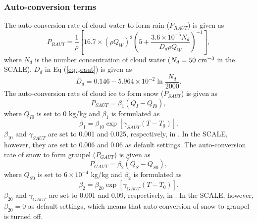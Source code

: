 \subsubsection{Auto-conversion terms}
The auto-conversion rate of cloud water to form rain ($P_{RAUT}$) is given as
\begin{equation}
  P_{RAUT}=\frac{1}{\rho}\left[16.7\times(\rho Q_{W})^{2}\left(5+\frac{3.6\times10^{-5}N_{d}}{D_{d}\rho Q_{W}}\right)^{-1}\right]\label{eq:praut},
\end{equation}
where $N_{d}$ is the number concentration of cloud water ($N_{d}=50 {\rm \ cm^{-3}}$ in the SCALE). $D_{d}$ in Eq (\ref{eq:praut}) is given as
\begin{equation}
  D_{d}=0.146-5.964\times10^{-2}\ln{\frac{N_{d}}{2000}}.
\end{equation}
The auto-conversion rate of cloud ice to form snow ($P_{SAUT}$) is given as
\begin{equation}
  P_{SAUT}=\beta_{1}(Q_{I}-Q_{I0}),
\end{equation}
where $Q_{I0}$ is set to 0 kg/kg and $\beta_{1}$ is formulated as
\begin{equation}
  \beta_{1}=\beta_{10}\exp[\gamma_{SAUT}(T-T_{0})].
\end{equation}
$\beta_{10}$ and $\gamma_{SAUT}$ are set to 0.001 and 0.025, respectively, in \citet{tomita_2008}. In the SCALE, however, they are set to 0.006 and 0.06 as default settings. The auto-conversion rate of snow to form graupel ($P_{GAUT}$) is given as
\begin{equation}
  P_{GAUT}=\beta_{2}(Q_{S}-Q_{S0}),
\end{equation}
where $Q_{S0}$ is set to $6\times10^{-4}$ kg/kg and $\beta_{2}$ is formulated as
\begin{equation}
  \beta_{2}=\beta_{20}\exp[\gamma_{GAUT}(T-T_{0})].
\end{equation}
$\beta_{20}$ and $\gamma_{GAUT}$ are set to 0.001 and 0.09, respectively, in \citet{tomita_2008}. In the SCALE, however, $\beta_{20} = 0$ as default settings, which means that auto-conversion of snow to graupel is turned off.


